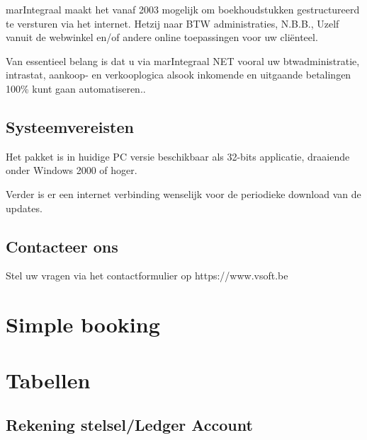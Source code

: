 \documentclass[12pt]{report} %
\begin{document}
marIntegraal maakt het vanaf 2003 mogelijk om boekhoudstukken gestructureerd te
versturen via het internet. Hetzij naar BTW administraties, N.B.B., Uzelf vanuit
de webwinkel en/of andere online toepassingen voor uw cliënteel.

Van essentieel belang is dat u via marIntegraal NET vooral uw btwadministratie,
intrastat, aankoop- en verkooplogica alsook inkomende en uitgaande betalingen 100\%
kunt gaan automatiseren..

\section{Systeemvereisten}
Het pakket is in huidige PC versie beschikbaar als 32-bits applicatie, draaiende
onder Windows 2000 of hoger.

Verder is er een internet verbinding wenselijk voor de
periodieke download van de updates.

\section{Contacteer ons}
Stel uw vragen via het contactformulier op https://www.vsoft.be

\chapter{Simple booking}

\lipsum

\chapter{Tabellen}

\section{Rekening stelsel/Ledger Account}
\end{document}
